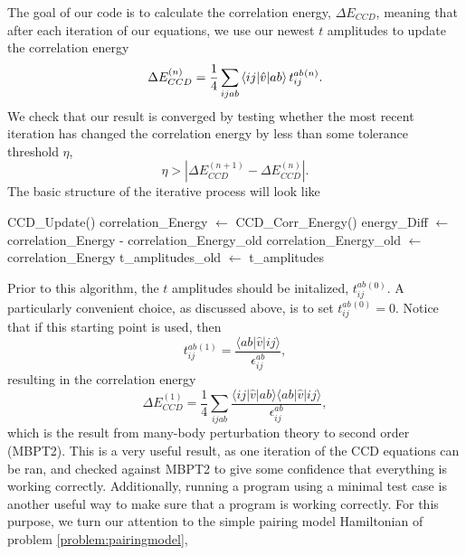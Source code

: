    The goal of our code is to calculate the correlation energy,
   $\Delta E_{CCD}$, meaning that after each iteration of our equations, we use
   our newest $t$ amplitudes to update the correlation energy
  \begin{equation}
  \Delta E_{CCD}^{(n)} = \frac{1}{4} \sum_{ijab}
  \braket{ij|\hat{v}|ab}t^{ab}_{ij}{}^{(n)}.
  \end{equation}
  We check that our result is converged by testing whether the
  most recent iteration has changed the correlation energy by less
  than some tolerance threshold $\eta$,
  \begin{equation}
  \eta > | \Delta E_{CCD}^{(n+1)} - \Delta E_{CCD}^{(n)} |.
  \end{equation}
  The basic structure of the iterative process will look like
\begin{svgraybox}
  \begin{algorithmic}
     \State CCD\_Update()
    \State correlation\_Energy $\gets$ CCD\_Corr\_Energy() \State
    energy\_Diff $\gets$ correlation\_Energy -
    correlation\_Energy\_old \State correlation\_Energy\_old $\gets$
    correlation\_Energy \State t\_amplitudes\_old $\gets$
    t\_amplitudes \EndWhile
  \end{algorithmic}
\end{svgraybox}
  Prior to this algorithm, the $t$ amplitudes should be initalized,
  $t_{ij}^{ab}{}^{(0)}$. A particularly convenient choice, as discussed above, is to set
  $t_{ij}^{ab}{}^{(0)} = 0$. Notice that if this starting point is
  used, then
  \begin{equation}
  t_{ij}^{ab}{}^{(1)} = \frac{\langle ab \vert \hat{v} \vert ij\rangle}{\epsilon^{ab}_{ij}},
  \label{eq:ccdGuess}
  \end{equation}
resulting in the correlation energy
  \begin{equation}
  \Delta E_{CCD}^{(1)} = \frac{1}{4} \sum_{ijab}\frac{\langle ij \vert \hat{v} \vert ab \rangle\langle ab \vert \hat{v} \vert ij \rangle}{\epsilon^{ab}_{ij}},
  \end{equation}
  which is the result from many-body perturbation theory to second order (MBPT2).  This is a very useful result, as one iteration
  of the CCD equations can be ran, and checked against MBPT2 to give
  some confidence that everything is working correctly. Additionally, running a program using a minimal test case is another useful way to make sure that a program is working correctly. For this purpose, we turn our attention to the simple pairing model Hamiltonian of problem \ref{problem:pairingmodel},
